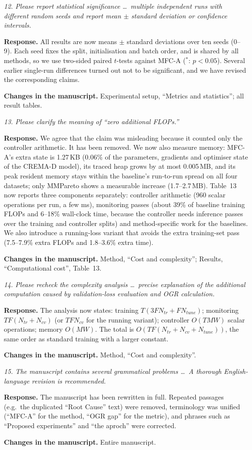\documentclass[11pt,a4paper]{article}
\newcommand{\rc}[1]{\par\noindent\colorbox{gray!12}{\parbox{\dimexpr\linewidth-2\fboxsep}{\small\textit{#1}}}\par}
\newcommand{\resp}{\par\noindent\textbf{Response.} }
\newcommand{\chg}{\par\noindent\textbf{Changes in the manuscript.} }
\begin{document}
\rc{12. Please report statistical significance \ldots\ multiple independent runs with different random seeds and report mean $\pm$ standard deviation or confidence intervals.}
\resp All results are now means $\pm$ standard deviations over ten seeds (0--9). Each seed fixes the split, initialisation and batch order, and is shared by all methods, so we use two-sided paired $t$-tests against MFC-A ($^{*}$: $p<0.05$). Several earlier single-run differences turned out not to be significant, and we have revised the corresponding claims.
\chg Experimental setup, ``Metrics and statistics''; all result tables.

\rc{13. Please clarify the meaning of ``zero additional FLOPs.''}
\resp We agree that the claim was misleading because it counted only the controller arithmetic. It has been removed. We now also measure memory: MFC-A's extra state is 1.27\,KB (0.06\% of the parameters, gradients and optimiser state of the CREMA-D model), its traced heap grows by at most 0.005\,MB, and its peak resident memory stays within the baseline's run-to-run spread on all four datasets; only MMPareto shows a measurable increase (1.7--2.7\,MB). Table~13 now reports three components separately: controller arithmetic (960 scalar operations per run, a few ms), monitoring passes (about 39\% of baseline training FLOPs and 6--18\% wall-clock time, because the controller needs inference passes over the training and controller splits) and method-specific work for the baselines. We also introduce a running-loss variant that avoids the extra training-set pass (7.5--7.9\% extra FLOPs and 1.8--3.6\% extra time).
\chg Method, ``Cost and complexity''; Results, ``Computational cost'', Table~13.

\rc{14. Please recheck the complexity analysis \ldots\ precise explanation of the additional computation caused by validation-loss evaluation and OGR calculation.}
\resp The analysis now states: training $T(3FN_{tr}+FN_{tune})$; monitoring $TF(N_{tr}+N_{cv})$ (or $TFN_{cv}$ for the running variant); controller $O(TMW)$ scalar operations; memory $O(MW)$. The total is $O(TF(N_{tr}+N_{cv}+N_{tune}))$, the same order as standard training with a larger constant.
\chg Method, ``Cost and complexity''.

\rc{15. The manuscript contains several grammatical problems \ldots\ A thorough English-language revision is recommended.}
\resp The manuscript has been rewritten in full. Repeated passages (e.g.\ the duplicated ``Root Cause'' text) were removed, terminology was unified (``MFC-A'' for the method, ``OGR gap'' for the metric), and phrases such as ``Proposed experiments'' and ``the aproch'' were corrected.
\chg Entire manuscript.
\end{document}
